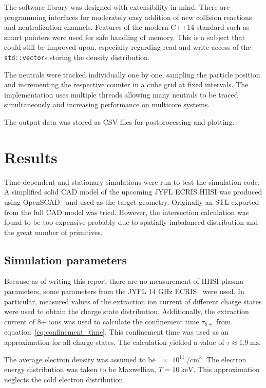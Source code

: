 \documentclass[a4paper,twoside,12pt]{article}
\begin{document}
The software library was designed with extensibility in mind. There are programming interfaces for moderately easy addition of new collision reactions and neutralization channels. Features of the modern \textsc{C++14} standard such as smart pointers were used for safe handling of memory. This is a subject that could still be improved upon, especially regarding read and write access of the \texttt{std::vector}s storing the density distribution.

The neutrals were tracked individually one by one, sampling the particle position and incrementing the respective counter in a cube grid at fixed intervals. The implementation uses multiple threads allowing many neutrals to be traced simultaneously and increasing performance on multicore systems.

The output data was stored as CSV files for postprocessing and plotting.

\section{Results}
Time-dependent and stationary simulations were run to test the simulation code. A simplified solid CAD model of the upcoming JYFL ECRIS HIISI was produced using OpenSCAD~\cite{openscad} and used as the target geometry. Originally an STL exported from the full CAD model was tried. However, the intersection calculation was found to be too expensive probably due to spatially imbalanced distribution and the great number of primitives.

\subsection{Simulation parameters}
Because as of writing this report there are no measurement of HIISI plasma parameters, some parameters from the JYFL 14 GHz ECRIS~\cite{jyfl:ecris14} were used. In particular, measured values of the extraction ion current of different charge states were used to obtain the charge state distribution. Additionally, the extraction current of 8+ ions was used to calculate the confinement time $\tau_{8+}$ from equation~\eqref{eq:confinement_time}. This confinement time was used as an approximation for all charge states. The calculation yielded a value of $\tau \approx \SI{1.9}{\milli\second}$.

The average electron density was assumed to be $\SI{e11}{\per\centi\meter\cubed}$. The electron energy distribution was taken to be Maxwellian, $T = \SI{10}{\kilo\electronvolt}$. This approximation neglects the cold electron distribution.
\end{document}
